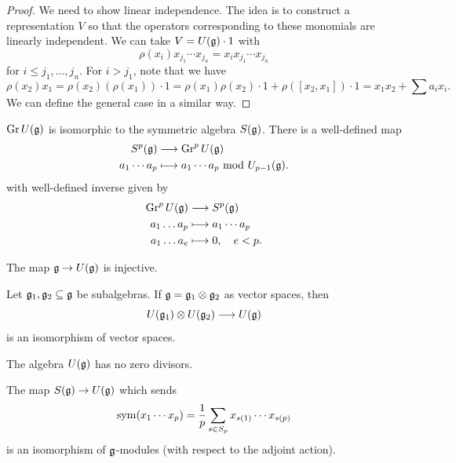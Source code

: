 \begin{proof}
  We need to show linear independence.
  The idea is to construct a representation $V$
  so that the operators corresponding to these
  monomials are linearly independent.
  We can take
  $V = U(\mathfrak{g}) \cdot 1$ with
  \[
    \rho(x_i) x_{j_1} \cdots x_{j_n}
    = x_i x_{j_1} \cdots x_{j_n}
  \]
  for $i \le j_1, \dots, j_n$.
  For $i > j_1$, note that we have
  \[
    \rho(x_2) x_1 = \rho(x_2)(\rho(x_1)) \cdot 1
    = \rho(x_1) \rho(x_2) \cdot 1
    + \rho([x_2, x_1]) \cdot 1
    = x_1 x_2 + \sum a_i x_i.
  \]
  We can define the general case in a
  similar way.
\end{proof}

\begin{theorem}
  $\operatorname{Gr} U(\mathfrak{g})$ is isomorphic to the symmetric
  algebra $S(\mathfrak{g})$. There is a well-defined
  map
  \begin{align*}
    S^p(\mathfrak{g}) &\longrightarrow \operatorname{Gr}^p U(\mathfrak{g}) \\
    a_1 \cdots a_p
    &\longmapsto
    a_1 \cdots a_p \ {\mathrm{mod}\ U_{p - 1}(\mathfrak{g})}.
  \end{align*}
  with well-defined inverse given by
  \begin{align*}
    \operatorname{Gr}^p U(\mathfrak{g}) &\longrightarrow S^p(\mathfrak{g}) \\
    a_1 \dots a_p
    &\longmapsto
    a_1 \cdots a_p \\
    a_1 \dots a_e
    &\longmapsto
    0, \quad e < p.
  \end{align*}
\end{theorem}

\begin{corollary}
  The map $\mathfrak{g} \to U(\mathfrak{g})$ is injective.
\end{corollary}

\begin{corollary}
  Let $\mathfrak{g}_1, \mathfrak{g}_2 \subseteq \mathfrak{g}$ be subalgebras.
  If $\mathfrak{g} = \mathfrak{g}_1 \otimes \mathfrak{g}_2$ as
  vector spaces, then
  \[
    U(\mathfrak{g}_1) \otimes U(\mathfrak{g}_2) \longrightarrow U(\mathfrak{g})
  \]
  is an isomorphism of vector spaces.
\end{corollary}

\begin{corollary}
  The algebra $U(\mathfrak{g})$ has no zero divisors.
\end{corollary}

\begin{theorem}
  The map $S(\mathfrak{g}) \to U(\mathfrak{g})$ which sends
  \[
    \operatorname{sym}(x_1 \cdots x_p)
    = \frac{1}{p} \sum_{s \in S_p}
    x_{s(1)} \cdots x_{s(p)}
  \]
  is an isomorphism of $\mathfrak{g}$-modules
  (with respect to the adjoint action).
\end{theorem}

